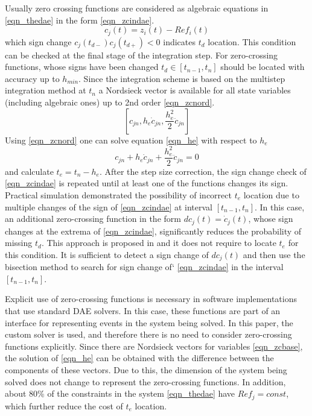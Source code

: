 \documentclass[lettersize,journal]{IEEEtran}
\begin{document}
Usually zero crossing functions are considered as algebraic equations in \eqref{eqn_thedae} in the form \eqref{eqn_zcindae}.
\begin{equation}
	\label{eqn_zcindae}
	c_j(t)=z_i(t)-Ref_i(t)
\end{equation}
\noindent which sign change \(c_j(t_{d-}) c_j(t_{d+}) < 0 \) indicates \(t_d\) location. This condition can be checked at the final stage of the integration step.
For zero-crossing functions, whose signs have been changed \(t_d \in [t_{n-1}, t_n]\) should be located with accuracy up to \(h_{min}\). Since the integration scheme is based on the multistep integration method at \(t_n\) a Nordsieck vector is available for all state variables (including algebraic ones) up to 2nd order \eqref{eqn_zcnord}.
\begin{equation}
	\label{eqn_zcnord}
	\left[ c_{jn}, h_e\dot{c}_{jn}, \frac{h_e^2}{2}\ddot{c}_{jn}\right]
\end{equation}
Using \eqref{eqn_zcnord} one can solve equation \eqref{eqn_he} with respect to \(h_e\)
\begin{equation}
	\label{eqn_he}
	c_{jn}+h_e\dot{c}_{jn}+\frac{h_e^2}{2}\ddot{c}_{jn} = 0
\end{equation}
\noindent and calculate \(t_e = t_n - h_e\). After the step size correction, the sign change check of \eqref{eqn_zcindae}  is repeated until at least one of the functions changes its sign.
Practical simulation demonstrated the possibility of incorrect \(t_e\) location due to multiple changes of the sign of \eqref{eqn_zcindae} at interval \(\left[t_{n-1},t_n\right]\). In this case, an additional zero-crossing function in the form \(dc_j(t)=\dot{c}_j(t)\), whose sign changes at the extrema of \eqref{eqn_zcindae}, significantly reduces the probability of missing \(t_d\). This approach is proposed in \cite{cellier06} and it does not require to locate \(t_e\) for this condition. It is sufficient to detect a sign change of \(dc_j(t)\) and then use the bisection method to search for sign change of` \eqref{eqn_zcindae} in the interval \(\left[t_{n-1},t_n\right]\).

Explicit use of zero-crossing functions is necessary in software implementations that use standard DAE solvers. In this case, these functions are part of an interface for representing events in the system being solved. In this paper, the custom solver is used, and therefore there is no need to consider zero-crossing functions explicitly. Since there are Nordsieck vectors for variables \eqref{eqn_zcbase}, the solution of \eqref{eqn_he} can be obtained with the difference between the components of these vectors. Due to this, the dimension of the system being solved does not change to represent the zero-crossing functions. In addition, about 80\% of the constraints in the system \eqref{eqn_thedae} have \(Ref_j=const\), which further reduce the cost of \(t_e\) location.
\end{document}
